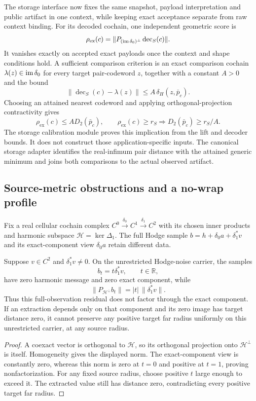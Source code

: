 The storage interface now fixes the same snapshot, payload interpretation
and public artifact in one context, while keeping exact acceptance separate
from raw context binding. For its decoded cochain, one independent geometric
score is
\[
  \rho_{\mathrm{ex}}(c)
   =\|P_{(\operatorname{im}\delta_0)^\perp}\operatorname{dec}_S(c)\|.
\]
It vanishes exactly on accepted exact payloads once the context and shape
conditions hold. A sufficient comparison criterion is an exact comparison cochain
\(\lambda(z)\in\operatorname{im}\delta_0\) for every target pair-codeword \(z\),
together with a constant \(A>0\) and the bound
\[
  \|\operatorname{dec}_S(c)-\lambda(z)\|
    \le A\,\delta_H(z,\bar p_c).
\]
Choosing an attained nearest codeword and applying orthogonal-projection
contractivity gives
\[
  \rho_{\mathrm{ex}}(c)\le A D_2(\bar p_c),
  \qquad
  \rho_{\mathrm{ex}}(c)\ge r_S
    \Longrightarrow D_2(\bar p_c)\ge r_S/A.
\]
The storage calibration module proves this implication from the lift and
decoder bounds. It does not construct those application-specific inputs.
The canonical storage adapter identifies the real-infimum pair distance
with the attained generic minimum and joins both comparisons to the actual
observed artifact.

\subsection{Source-metric obstructions and a no-wrap profile}

Fix a real cellular cochain complex
\(C^0\xrightarrow{\delta_0}C^1\xrightarrow{\delta_1}C^2\)
with its chosen inner products and harmonic subspace
\(\mathcal H=\ker\Delta_1\). The full Hodge sample
\(b=h+\delta_0a+\delta_1^*v\) and its exact-component view
\(\delta_0a\) retain different data.

\begin{proposition}
\label{prop:exact-component-obstruction}
  Suppose \(v\in C^2\) and \(\delta_1^*v\ne0\). On the unrestricted
  Hodge-noise carrier, the samples
  \[
    b_t=t\delta_1^*v,\qquad t\in\mathbb R,
  \]
  have zero harmonic message and zero exact component, while
  \[
    \|P_{\mathcal H^\perp}b_t\|
      =|t|\,\|\delta_1^*v\|.
  \]
  Thus this full-observation residual does not factor through the exact
  component. If an extraction depends only on that component and its zero
  image has target distance zero, it cannot preserve any positive target
  far radius uniformly on this unrestricted carrier, at any source radius.
\end{proposition}
\begin{proof}
  A coexact vector is orthogonal to \(\mathcal H\), so its orthogonal
  projection onto \(\mathcal H^\perp\) is itself. Homogeneity gives the
  displayed norm. The exact-component view is constantly zero, whereas
  this norm is zero at \(t=0\) and positive at \(t=1\), proving
  nonfactorization. For any fixed source radius, choose positive \(t\)
  large enough to exceed it. The extracted value still has distance zero,
  contradicting every positive target far radius.
\end{proof}

